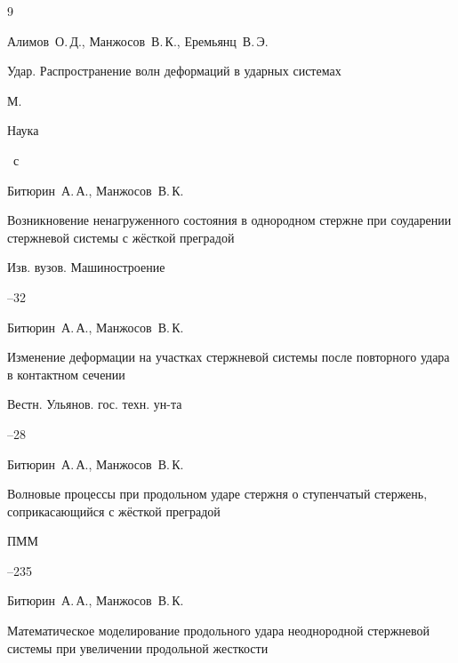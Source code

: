 \begin{thebibliography}{9}




\by Алимов~О.\,Д., Манжосов~В.\,К., Еремьянц~В.\,Э.

\book Удар. Распространение волн деформаций в ударных системах

\publaddr М.

\publ Наука


~с




\by Битюрин~А.\,А., Манжосов~В.\,К.

\paper Возникновение ненагруженного состояния в однородном стержне при соударении стержневой системы с жёсткой преградой

\jour Изв. вузов. Машиностроение



--32




\by Битюрин~А.\,А., Манжосов~В.\,К.

\paper Изменение деформации на участках стержневой системы после повторного удара в контактном сечении

\jour Вестн. Ульянов. гос. техн. ун-та



--28




\by Битюрин~А.\,А., Манжосов~В.\,К.

\paper Волновые процессы при продольном ударе стержня о ступенчатый стержень, соприкасающийся с жёсткой преградой

\jour ПММ




--235




\by Битюрин~А.\,А., Манжосов~В.\,К.

\paper Математическое моделирование продольного удара неоднородной стержневой системы при увеличении продольной жесткости


\end{thebibliography}
